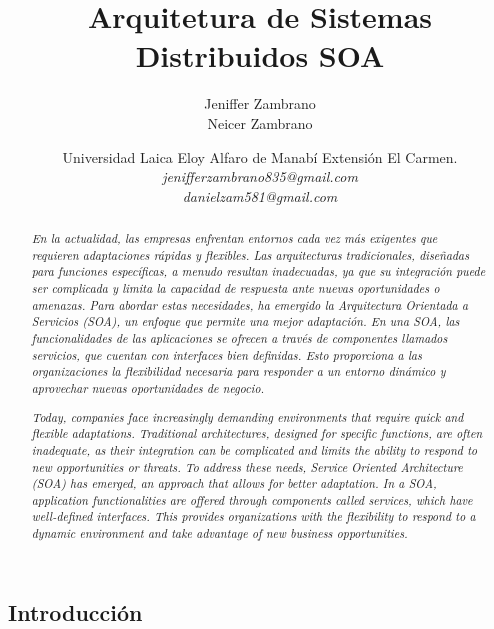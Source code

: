 \documentclass[10pt]{article}
\title{\Huge Arquitetura de Sistemas Distribuidos SOA}
\author{\large Jeniffer Zambrano \\ Neicer Zambrano}
\date{\normalsize Universidad Laica Eloy Alfaro de Manabí Extensión El Carmen.\\
\textit{\large jenifferzambrano835@gmail.com \\ danielzam581@gmail.com}}
\begin{document}
\maketitle


\begin{abstract}
    \textit{\normalsize En la actualidad, las empresas enfrentan entornos cada vez más exigentes que requieren adaptaciones rápidas y flexibles. Las arquitecturas tradicionales, diseñadas para funciones específicas, a menudo resultan inadecuadas, ya que su integración puede ser complicada y limita la capacidad de respuesta ante nuevas oportunidades o amenazas. Para abordar estas necesidades, ha emergido la Arquitectura Orientada a Servicios (SOA), un enfoque que permite una mejor adaptación. En una SOA, las funcionalidades de las aplicaciones se ofrecen a través de componentes llamados servicios, que cuentan con interfaces bien definidas. Esto proporciona a las organizaciones la flexibilidad necesaria para responder a un entorno dinámico y aprovechar nuevas oportunidades de negocio.}
    
    \vspace{1 cm}

\end{abstract}


\begin{abstract}
    \textit{\normalsize Today, companies face increasingly demanding environments that require quick and flexible adaptations. Traditional architectures, designed for specific functions, are often inadequate, as their integration can be complicated and limits the ability to respond to new opportunities or threats. To address these needs, Service Oriented Architecture (SOA) has emerged, an approach that allows for better adaptation. In a SOA, application functionalities are offered through components called services, which have well-defined interfaces. This provides organizations with the flexibility to respond to a dynamic environment and take advantage of new business opportunities.}
    
    \vspace{1 cm}

\end{abstract}



\begin{center}
    \section{Introducción}
\end{center}
\end{document}
